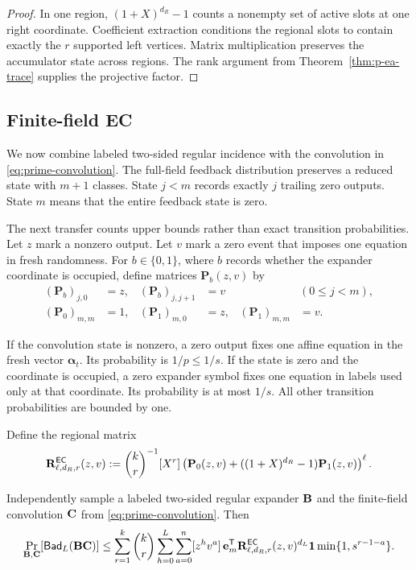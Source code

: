 \begin{proof}
In one region, $(1+X)^{d_R}-1$ counts a nonempty set of active slots at one
right coordinate.  Coefficient extraction conditions the regional slots to
contain exactly the $r$ supported left vertices.  Matrix multiplication
preserves the accumulator state across regions.  The rank argument from
Theorem~\ref{thm:p-ea-trace} supplies the projective factor.
\end{proof}

\subsection{Finite-field EC}

We now combine labeled two-sided regular incidence with the convolution in
\eqref{eq:prime-convolution}.  The full-field feedback distribution preserves
a reduced state with $m+1$ classes.  State $j<m$ records exactly $j$ trailing
zero outputs.  State $m$ means that the entire feedback state is zero.

The next transfer counts upper bounds rather than exact transition
probabilities.  Let $z$ mark a nonzero output.  Let $v$ mark a zero event that
imposes one equation in fresh randomness.  For $b\in\{0,1\}$, where $b$
records whether the expander coordinate is occupied, define matrices
$\mathbf P_b(z,v)$ by
\begin{align}
 (\mathbf P_b)_{j,0}&=z,&
 (\mathbf P_b)_{j,j+1}&=v
 &&(0\leq j<m),
 \label{eq:p-ec-active-trace}\\
 (\mathbf P_0)_{m,m}&=1,&
 (\mathbf P_1)_{m,0}&=z,&
 (\mathbf P_1)_{m,m}&=v.
 \label{eq:p-ec-zero-trace}
\end{align}

If the convolution state is nonzero, a zero output fixes one affine equation
in the fresh vector $\boldsymbol\alpha_t$.  Its probability is $1/p\leq1/s$.
If the state is zero and the coordinate is occupied, a zero expander symbol
fixes one equation in labels used only at that coordinate.  Its probability
is at most $1/s$.  All other transition probabilities are bounded by one.

Define the regional matrix
\begin{equation}
 \mathbf R^{\mathsf{EC}}_{\ell,d_R,r}(z,v):=
 \binom{k}{r}^{-1}[X^r]
 \left(\mathbf P_0(z,v)+
 ((1+X)^{d_R}-1)\mathbf P_1(z,v)\right)^\ell.
 \label{eq:p-ec-biregular-region}
\end{equation}

\begin{theorem}
\label{thm:p-ec-trace}
Independently sample a labeled two-sided regular expander $\mathbf B$ and the
finite-field convolution $\mathbf C$ from \eqref{eq:prime-convolution}.  Then
\begin{equation}
 \Pr_{\mathbf B,\mathbf C}[\mathsf{Bad}_L(\mathbf B\mathbf C)]\leq
 \sum_{r=1}^{k}\binom{k}{r}
 \sum_{h=0}^{L}\sum_{a=0}^{n}[z^hv^a]\,
 \mathbf e_m^{\mathsf T}
 \mathbf R^{\mathsf{EC}}_{\ell,d_R,r}(z,v)^{d_L}\mathbf 1
 \min\{1,s^{r-1-a}\}.
 \label{eq:p-ec-trace}
\end{equation}
\end{theorem}

